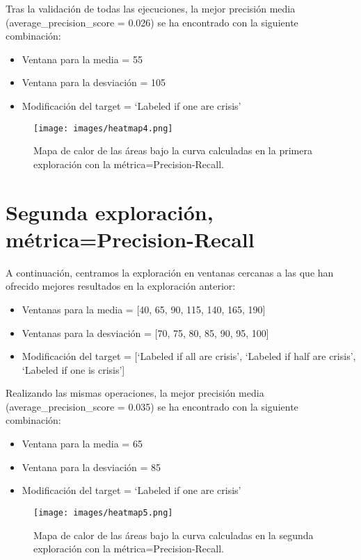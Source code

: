 \documentclass[a4paper,12pt,twoside,oldfontcommands]{memoir}
\begin{document}
	Tras la validación de todas las ejecuciones, la mejor precisión media (average\_precision\_score = 0.026) se ha encontrado con la siguiente combinación: 
	\begin{itemize}
		\item Ventana para la media = 55
		\item Ventana para la desviación = 105
		\item Modificación del target = `Labeled if one are crisis'
	\end{itemize}
	
	\begin{figure}
		\centering
		\texttt{[image: images/heatmap4.png]}
		\caption{Mapa de calor de las áreas bajo la curva calculadas en la primera exploración con la métrica=Precision-Recall.}
		\label{fig:heatmap4}
	\end{figure}
	
	\section{Segunda exploración, métrica=Precision-Recall}
	
	A continuación, centramos la exploración en ventanas cercanas a las que han ofrecido mejores resultados en la exploración anterior:
	
	\begin{itemize}
		\item Ventanas para la media = [40, 65, 90, 115, 140, 165, 190]
		\item Ventanas para la desviación = [70, 75, 80, 85, 90, 95, 100]
		\item Modificación del target = [`Labeled if all are crisis', `Labeled if half are crisis', `Labeled if one is crisis']
	\end{itemize}
	
	Realizando las mismas operaciones, la mejor precisión media (average\_precision\_score = 0.035) se ha encontrado con la siguiente combinación: 
	\begin{itemize}
		\item Ventana para la media = 65
		\item Ventana para la desviación = 85
		\item Modificación del target = `Labeled if one are crisis'
	\end{itemize}
	
	\begin{figure}
		\centering
		\texttt{[image: images/heatmap5.png]}
		\caption{Mapa de calor de las áreas bajo la curva calculadas en la segunda exploración con la métrica=Precision-Recall.}
		\label{fig:heatmap5}
	\end{figure}
	
\end{document}
